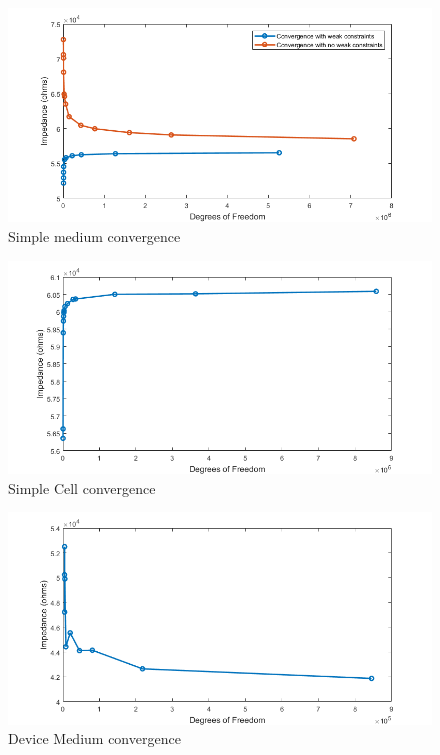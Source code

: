 \begin{figure}
    \centering
    \includegraphics[width=\textwidth]{images/simpeMediumConvergenceNoValidation.png}
    \caption{Simple medium convergence}
    \label{fig:simple_medium_convergence}
\end{figure}
\begin{figure}
    \centering
    \includegraphics[width=\textwidth]{images/simpleCellConvergence.png}
    \caption{Simple Cell convergence}
    \label{fig:simple_cell_convergence}
\end{figure}
\begin{figure}
    \centering
    \includegraphics[width=\textwidth]{images/device_medium_convergence.png}
    \caption{Device Medium convergence}
    \label{fig:device_medium_convergence}
\end{figure}
